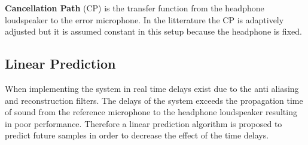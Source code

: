 \textbf{Cancellation Path} (CP) is the transfer function from the headphone loudspeaker to the error microphone. In the litterature \cite{Hansen} the CP is adaptively adjusted but it is assumed constant in this setup because the headphone is fixed.     


\subsection*{Linear Prediction}
When implementing the system in real time delays exist due to the anti aliasing and reconstruction filters. The delays of the system exceeds the propagation time of sound from the reference microphone to the headphone loudspeaker resulting in poor performance. Therefore a linear prediction algorithm is proposed to predict future samples in order to decrease the effect of the time delays.     
